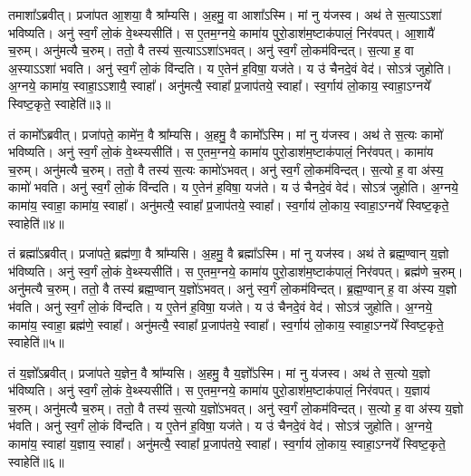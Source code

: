   तमाशा᳚ऽब्रवीत्।
   प्रजा॑पत आ॒शया॒ वै श्रा᳚म्यसि।
   अ॒हमु॒ वा आशा᳚ऽस्मि।
   मां नु य॑जस्व।
   अथ॑ ते स॒त्याऽऽशा॑ भविष्यति।
   अनु॑ स्व॒र्गं लो॒कं वे॒थ्स्यसीति॑।
   स ए॒तम॒ग्नये॒ कामा॑य पुरो॒डाश॑म॒ष्टाक॑पालं॒ निर॑वपत्।
   आ॒शायै॑ च॒रुम्।
   अनु॑मत्यै च॒रुम्।
   ततो॒ वै तस्य॑ स॒त्याऽऽशा॑ऽभवत्।
   अनु॑ स्व॒र्गं लो॒कम॑विन्दत्।
   स॒त्या ह॒ वा अ॒स्याऽऽशा॑ भवति।
   अनु॑ स्व॒र्गं लो॒कं वि॑न्दति।
   य ए॒तेन॑ ह॒विषा॒ यज॑ते।
   य उ॑ चैनदे॒वं वेद॑।
   सोऽत्र॑ जुहोति।
   अ॒ग्नये॒ कामा॑य॒ स्वाहा॒ऽऽशायै॒ स्वाहा᳚।
   अनु॑मत्यै॒ स्वाहा᳚ प्र॒जाप॑तये॒ स्वाहा᳚।
   स्व॒र्गाय॑ लो॒काय॒ स्वाहा॒ऽग्नये᳚ स्विष्ट॒कृते॒ स्वाहेति॑॥३॥

   तं कामो᳚ऽब्रवीत्।
   प्रजा॑पते॒ कामे॑न॒ वै श्रा᳚म्यसि।
   अ॒हमु॒ वै कामो᳚ऽस्मि।
   मां नु य॑जस्व।
   अथ॑ ते स॒त्यः कामो॑ भविष्यति।
   अनु॑ स्व॒र्गं लो॒कं वे॒थ्स्यसीति॑।
   स ए॒तम॒ग्नये॒ कामा॑य पुरो॒डाश॑म॒ष्टाक॑पालं॒ निर॑वपत्।
   कामा॑य च॒रुम्।
   अनु॑मत्यै च॒रुम्।
   ततो॒ वै तस्य॑ स॒त्यः कामो॑ऽभवत्।
   अनु॑ स्व॒र्गं लो॒कम॑विन्दत्।
   स॒त्यो ह॒ वा अ॑स्य॒ कामो॑ भवति।
   अनु॑ स्व॒र्गं लो॒कं वि॑न्दति।
   य ए॒तेन॑ ह॒विषा॒ यज॑ते।
   य उ॑ चैनदे॒वं वेद॑।
   सोऽत्र॑ जुहोति।
   अ॒ग्नये॒ कामा॑य॒ स्वाहा॒ कामा॑य॒ स्वाहा᳚।
   अनु॑मत्यै॒ स्वाहा᳚ प्र॒जाप॑तये॒ स्वाहा᳚।
   स्व॒र्गाय॑ लो॒काय॒ स्वाहा॒ऽग्नये᳚ स्विष्ट॒कृते॒ स्वाहेति॑॥४॥

   तं ब्रह्मा᳚ऽब्रवीत्।
   प्रजा॑पते॒ ब्रह्म॑णा॒ वै श्रा᳚म्यसि।
   अ॒हमु॒ वै ब्रह्मा᳚ऽस्मि।
   मां नु यज॑स्व।
   अथ॑ ते ब्रह्म॒ण्वान् य॒ज्ञो भ॑विष्यति।
   अनु॑ स्व॒र्गं लो॒कं वे॒थ्स्यसीति॑।
   स ए॒तम॒ग्नये॒ कामा॑य पुरो॒डाश॑म॒ष्टाक॑पालं॒ निर॑वपत्।
   ब्रह्म॑णे च॒रुम्।
   अनु॑मत्यै च॒रुम्।
   ततो॒ वै तस्य॑ ब्रह्म॒ण्वान् य॒ज्ञो॑ऽभवत्।
   अनु॑ स्व॒र्गं लो॒कम॑विन्दत्।
   ब्र॒ह्म॒ण्वान् ह॒ वा अ॑स्य य॒ज्ञो भ॑वति।
   अनु॑ स्व॒र्गं लो॒कं वि॑न्दति।
   य ए॒तेन॑ ह॒विषा॒ यज॑ते।
   य उ॑ चैनदे॒वं वेद॑।
   सोऽत्र॑ जुहोति।
   अ॒ग्नये॒ कामा॑य॒ स्वाहा॒ ब्रह्म॑णे॒ स्वाहा᳚।
   अनु॑मत्यै॒ स्वाहा᳚ प्र॒जाप॑तये॒ स्वाहा᳚।
   स्व॒र्गाय॑ लो॒काय॒ स्वाहा॒ऽग्नये᳚ स्विष्ट॒कृते॒ स्वाहेति॑॥५॥

   तं य॒ज्ञो᳚ऽब्रवीत्।
   प्रजा॑पते य॒ज्ञेन॒ वै श्रा᳚म्यसि।
   अ॒हमु॒ वै य॒ज्ञो᳚ऽस्मि।
   मां नु य॑जस्व।
   अथ॑ ते स॒त्यो य॒ज्ञो भ॑विष्यति।
   अनु॑ स्व॒र्गं लो॒कं वे॒थ्स्यसीति॑।
   स ए॒तम॒ग्नये॒ कामा॑य पुरो॒डाश॑म॒ष्टाक॑पालं॒ निर॑वपत्।
   य॒ज्ञाय॑ च॒रुम्।
   अनु॑मत्यै च॒रुम्।
   ततो॒ वै तस्य॑ स॒त्यो य॒ज्ञो॑ऽभवत्।
   अनु॑ स्व॒र्गं लो॒कम॑विन्दत्।
   स॒त्यो ह॒ वा अ॑स्य य॒ज्ञो भ॑वति।
   अनु॑ स्व॒र्गं लो॒कं वि॑न्दति।
   य ए॒तेन॑ ह॒विषा॒ यज॑ते।
   य उ॑ चैनदे॒वं वेद॑।
   सोऽत्र॑ जुहोति।
   अ॒ग्नये॒ कामा॑य॒ स्वाहा॑ य॒ज्ञाय॒ स्वाहा᳚।
   अनु॑मत्यै॒ स्वाहा᳚ प्र॒जाप॑तये॒ स्वाहा᳚।
   स्व॒र्गाय॑ लो॒काय॒ स्वाहा॒ऽग्नये᳚ स्विष्ट॒कृते॒ स्वाहेति॑॥६॥

